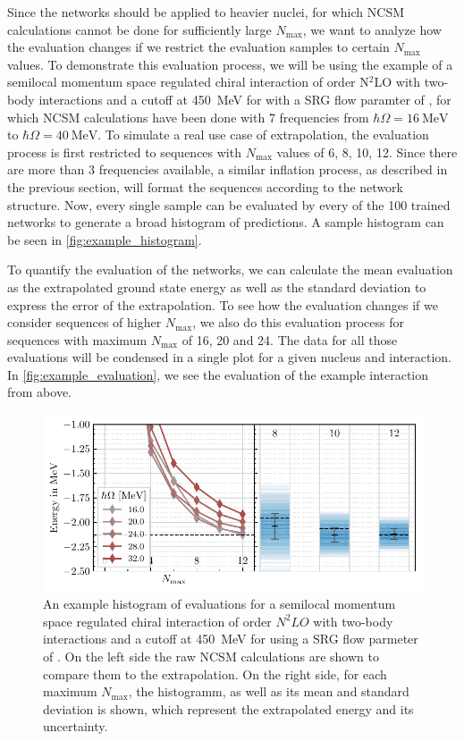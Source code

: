 Since the networks should be applied to heavier nuclei, for which NCSM calculations cannot be done for sufficiently large $N_\mathrm{max}$, we want to analyze how the evaluation changes if we restrict the evaluation samples to certain $N_\mathrm{max}$ values. To demonstrate this evaluation process, we will be using the example of a semilocal momentum space regulated chiral interaction of order N$^{2}$LO with two-body interactions and a cutoff at \SI{450}{\mega\electronvolt} for  with a SRG flow paramter of , for which NCSM calculations have been done with 7 frequencies from $\hbar\Omega = \SI{16}{\mega\electronvolt}$ to $\hbar\Omega = \SI{40}{\mega\electronvolt}$. To simulate a real use case of extrapolation, the evaluation process is first restricted to sequences with $N_\mathrm{max}$ values of 6, 8, 10, 12. Since there are more than 3 frequencies available, a similar inflation process, as described in the previous section, will format the sequences according to the network structure. Now, every single sample can be evaluated by every of the 100 trained networks to generate a broad histogram of predictions. A sample histogram can be seen in \autoref{fig:example_histogram}.


To quantify the evaluation of the networks, we can calculate the mean evaluation as the extrapolated ground state energy as well as the standard deviation to express the error of the extrapolation. To see how the evaluation changes if we consider sequences of higher $N_\mathrm{max}$, we also do this evaluation process for sequences with maximum $N_\mathrm{max}$ of 16, 20 and 24. The data for all those evaluations will be condensed in a single plot for a given nucleus and interaction. In \autoref{fig:example_evaluation}, we see the evaluation of the example interaction from above.

\begin{figure}[H]
  \centering
  \includegraphics[]{media/example_evaluation.pdf}
  \caption{An example histogram of evaluations for a semilocal momentum space regulated chiral interaction of order $N^{2}LO$ with two-body interactions and a cutoff at \SI{450}{\mega\electronvolt} for  using a SRG flow parmeter of . On the left side the raw NCSM calculations are shown to compare them to the extrapolation. On the right side, for each maximum $N_\mathrm{max}$, the histogramm, as well as its mean and standard deviation is shown, which represent the extrapolated energy and its uncertainty.}
  \label{fig:example_evaluation}
\end{figure}
